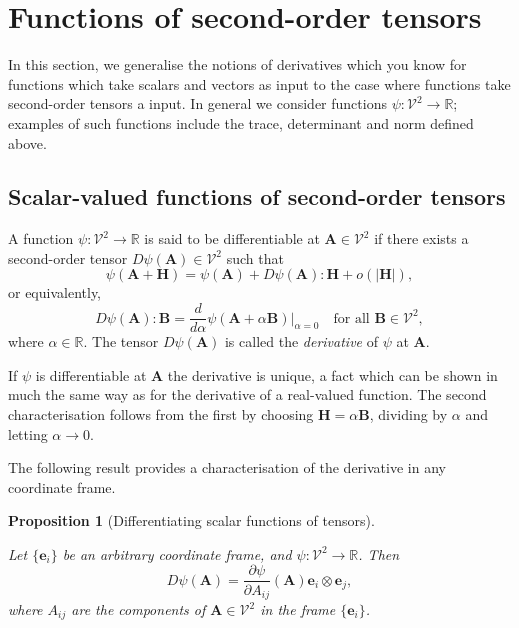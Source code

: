 \documentclass[
  letterpaper,
  DIV=11,
  numbers=noendperiod]{scrreprt}
\theoremstyle{plain}
\newtheorem{proposition}{Proposition}[chapter]
\theoremstyle{remark}
\begin{document}
\section{Functions of second-order
tensors}\label{functions-of-second-order-tensors}

In this section, we generalise the notions of derivatives which you know
for functions which take scalars and vectors as input to the case where
functions take second-order tensors a input. In general we consider
functions \(\psi:{\mathcal{V}}^2\to{\mathbb{R}}\); examples of such
functions include the trace, determinant and norm defined above.

\subsection{Scalar-valued functions of second-order
tensors}\label{scalar-valued-functions-of-second-order-tensors}

A function \(\psi:{\mathcal{V}}^2\to{\mathbb{R}}\) is said to be
differentiable at \({\boldsymbol{A}}\in{\mathcal{V}}^2\) if there exists
a second-order tensor \(D\psi({\boldsymbol{A}})\in{\mathcal{V}}^2\) such
that
\[\psi({\boldsymbol{A}}+{\boldsymbol{H}}) = \psi({\boldsymbol{A}}) + D\psi({\boldsymbol{A}}):{\boldsymbol{H}}+{o}(|{\boldsymbol{H}}|),\]
or equivalently,
\[D\psi({\boldsymbol{A}}):{\boldsymbol{B}}= \frac{d}{d\alpha}\psi({\boldsymbol{A}}+\alpha{\boldsymbol{B}})\bigg|_{\alpha=0}\quad\text{for all }{\boldsymbol{B}}\in{\mathcal{V}}^2,\]
where \(\alpha\in{\mathbb{R}}\). The tensor \(D\psi({\boldsymbol{A}})\)
is called the \emph{derivative} of \(\psi\) at \({\boldsymbol{A}}\).

If \(\psi\) is differentiable at \({\boldsymbol{A}}\) the derivative is
unique, a fact which can be shown in much the same way as for the
derivative of a real-valued function. The second characterisation
follows from the first by choosing
\({\boldsymbol{H}}=\alpha{\boldsymbol{B}}\), dividing by \(\alpha\) and
letting \(\alpha\to0\).

The following result provides a characterisation of the derivative in
any coordinate frame.

\begin{proposition}[Differentiating scalar functions of
tensors]\protect\hypertarget{prp-derivativetensor2scalar}{}\label{prp-derivativetensor2scalar}

Let \(\{{\boldsymbol{e}}_i\}\) be an arbitrary coordinate frame, and
\(\psi:{\mathcal{V}}^2\to{\mathbb{R}}\). Then
\[D\psi({\boldsymbol{A}}) = \frac{\partial \psi}{\partial A_{ij}}({\boldsymbol{A}}){\boldsymbol{e}}_i\otimes{\boldsymbol{e}}_j,\]
where \(A_{ij}\) are the components of
\({\boldsymbol{A}}\in{\mathcal{V}}^2\) in the frame
\(\{{\boldsymbol{e}}_i\}\).

\end{proposition}
\end{document}
